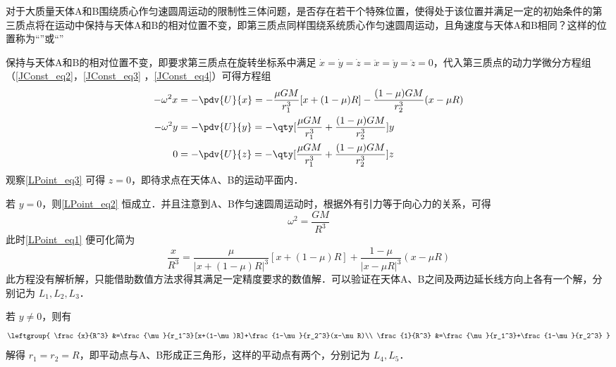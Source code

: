 

对于大质量天体A和B围绕质心作匀速圆周运动的限制性三体问题，是否存在若干个特殊位置，使得处于该位置并满足一定的初始条件的第三质点将在运动中保持与天体A和B的相对位置不变，即第三质点同样围绕系统质心作匀速圆周运动，且角速度与天体A和B相同？这样的位置称为“”或“”

保持与天体A和B的相对位置不变，即要求第三质点在旋转坐标系中满足 $\dot{x}=\dot{y}=\dot{z}=\ddot{x}=\ddot{y}=\ddot{z}=0$，代入第三质点的动力学微分方程组（\autoref{JConst_eq2}，\autoref{JConst_eq3} ，\autoref{JConst_eq4}）可得方程组
\begin{align}
-\omega^2 x &=- \pdv{U}{x}=-\frac{\mu GM}{r_1^3}[x+(1-\mu)R]-\frac{(1-\mu)GM}{r_2^3}(x-\mu R)\label{LPoint_eq1}\\
-\omega^2 y &=- \pdv{U}{y}=-\qty[\frac{\mu GM}{r_1^3}+\frac{(1-\mu)GM}{r_2^3}]y\label{LPoint_eq2}\\
0 &=- \pdv{U}{z} =-\qty[\frac{\mu GM}{r_1^3}+\frac{(1-\mu)GM}{r_2^3}]z\label{LPoint_eq3}
\end{align}
观察\autoref{LPoint_eq3} 可得 $z=0$，即待求点在天体A、B的运动平面内．

若 $y=0$，则\autoref{LPoint_eq2} 恒成立．并且注意到A、B作匀速圆周运动时，根据外有引力等于向心力的关系，可得
\begin{equation}%
\omega^2 =\frac{GM}{R^3}
\end{equation}
此时\autoref{LPoint_eq1} 便可化简为
\begin{equation}%
\frac{x}{R^3} =\frac{\mu}{|x+(1-\mu)R|^3}[x+(1-\mu)R]+\frac{1-\mu}{|x-\mu R|^3}(x-\mu R)
\end{equation}
此方程没有解析解，只能借助数值方法求得其满足一定精度要求的数值解．可以验证在天体A、B之间及两边延长线方向上各有一个解，分别记为 $L_1,L_2,L_3$．

若 $y\neq 0$，则有
\begin{equation}%
\leftgroup{
\frac{x}{R^3} &=\frac{\mu}{r_1^3}[x+(1-\mu)R]+\frac{1-\mu}{r_2^3}(x-\mu R)\\
\frac{1}{R^3} &=\frac{\mu}{r_1^3}+\frac{1-\mu}{r_2^3}
}
\end{equation}
解得 $r_1=r_2=R$，即平动点与A、B形成正三角形，这样的平动点有两个，分别记为 $L_4,L_5$．


